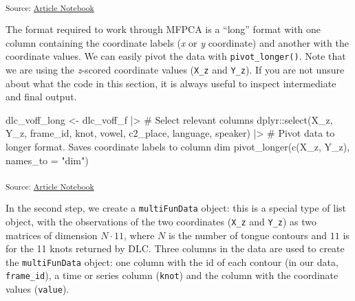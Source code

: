 \documentclass[
]{interact}
\newenvironment{Shaded}{\begin{snugshade}}{\end{snugshade}}
\newcommand{\AttributeTok}[1]{\textcolor[rgb]{0.40,0.45,0.13}{#1}}
\newcommand{\CommentTok}[1]{\textcolor[rgb]{0.37,0.37,0.37}{#1}}
\newcommand{\FunctionTok}[1]{\textcolor[rgb]{0.28,0.35,0.67}{#1}}
\newcommand{\NormalTok}[1]{\textcolor[rgb]{0.00,0.23,0.31}{#1}}
\newcommand{\OtherTok}[1]{\textcolor[rgb]{0.00,0.23,0.31}{#1}}
\newcommand{\SpecialCharTok}[1]{\textcolor[rgb]{0.37,0.37,0.37}{#1}}
\newcommand{\StringTok}[1]{\textcolor[rgb]{0.13,0.47,0.30}{#1}}
\begin{document}
\textsubscript{Source:
\href{https://stefanocoretta.github.io/mv_uti/index.qmd.html}{Article
Notebook}}

The format required to work through MFPCA is a ``long'' format with one
column containing the coordinate labels (\emph{x} or \emph{y}
coordinate) and another with the coordinate values. We can easily pivot
the data with \texttt{pivot\_longer()}. Note that we are using the
\emph{z}-scored coordinate values (\texttt{X\_z} and \texttt{Y\_z}). If
you are not unsure about what the code in this section, it is always
useful to inspect intermediate and final output.

\begin{Shaded}
\begin{Highlighting}[]
\NormalTok{dlc\_voff\_long }\OtherTok{\textless{}{-}}\NormalTok{ dlc\_voff\_f }\SpecialCharTok{|\textgreater{}} 
  \CommentTok{\# Select relevant columns}
\NormalTok{  dplyr}\SpecialCharTok{::}\FunctionTok{select}\NormalTok{(X\_z, Y\_z, frame\_id, knot, vowel, c2\_place, language, speaker) }\SpecialCharTok{|\textgreater{}} 
  \CommentTok{\# Pivot data to longer format. Saves coordinate labels to column \textasciigrave{}dim\textasciigrave{}}
  \FunctionTok{pivot\_longer}\NormalTok{(}\FunctionTok{c}\NormalTok{(X\_z, Y\_z), }\AttributeTok{names\_to =} \StringTok{"dim"}\NormalTok{)}
\end{Highlighting}
\end{Shaded}

\textsubscript{Source:
\href{https://stefanocoretta.github.io/mv_uti/index.qmd.html}{Article
Notebook}}

In the second step, we create a \texttt{multiFunData} object: this is a
special type of list object, with the observations of the two
coordinates (\texttt{X\_z} and \texttt{Y\_z}) as two matrices of
dimension \(N \cdot 11\), where \(N\) is the number of tongue contours
and \(11\) is for the 11 knots returned by DLC. Three columns in the
data are used to create the \texttt{multiFunData} object: one column
with the id of each contour (in our data, \texttt{frame\_id}), a time or
series column (\texttt{knot}) and the column with the coordinate values
(\texttt{value}).
\end{document}

